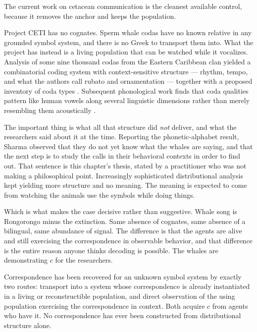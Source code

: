The current work on cetacean communication is the cleanest
available control, because it removes the anchor and keeps the
population.

Project CETI has no cognates.
Sperm whale codas have no known relative in any grounded symbol
system, and there is no Greek to transport them into.
What the project has instead is a living population that can be
watched while it vocalizes.
Analysis of some nine thousand codas from the Eastern Caribbean
clan yielded a combinatorial coding system with context-sensitive
structure --- rhythm, tempo, and what the authors call rubato and
ornamentation --- together with a proposed inventory of coda types
\cite{sharma2024}.
Subsequent phonological work finds that coda qualities pattern like
human vowels along several linguistic dimensions rather than merely
resembling them acoustically \cite{begus2026}.

The important thing is what all that structure did \emph{not}
deliver, and what the researchers said about it at the time.
Reporting the phonetic-alphabet result, Sharma observed that they
do not yet know what the whales are saying, and that the next step
is to study the calls in their behavioral contexts in order to
find out.
That sentence is this chapter's thesis, stated by a practitioner
who was not making a philosophical point.
Increasingly sophisticated distributional analysis kept yielding
more structure and no meaning.
The meaning is expected to come from watching the animals use the
symbols while doing things.

Which is what makes the case decisive rather than suggestive.
Whale song is Rongorongo minus the extinction.
Same absence of cognates, same absence of a bilingual, same
abundance of signal.
The difference is that the agents are alive and still exercising
the correspondence in observable behavior, and that difference is
the entire reason anyone thinks decoding is possible.
The whales are demonstrating $c$ for the researchers.

\begin{observation}
\label{obs:transport}
Correspondence has been recovered for an unknown symbol system by
exactly two routes: transport into a system whose correspondence is
already instantiated in a living or reconstructible population, and
direct observation of the using population exercising the
correspondence in context.
Both acquire $c$ from agents who have it.
No correspondence has ever been constructed from distributional
structure alone.
\end{observation}

